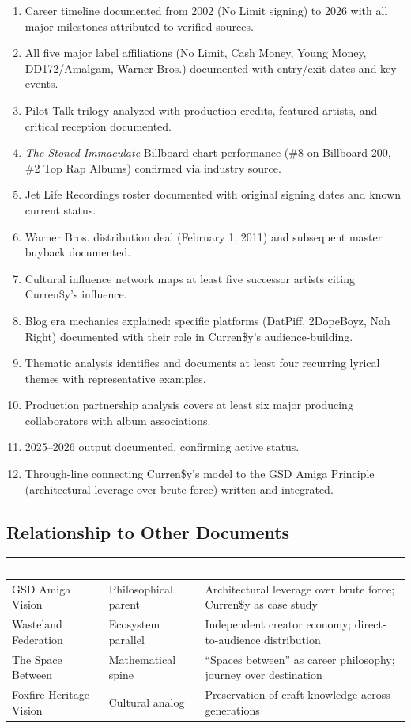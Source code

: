 \documentclass[11pt,letterpaper]{article}
\newcommand{\tableheader}[1]{\textbf{\sffamily\textcolor{white}{#1}}}
\begin{document}
\begin{enumerate}
  \item Career timeline documented from 2002 (No Limit signing) to 2026 with all major milestones attributed to verified sources.
  \item All five major label affiliations (No Limit, Cash Money, Young Money, DD172/Amalgam, Warner Bros.) documented with entry/exit dates and key events.
  \item Pilot Talk trilogy analyzed with production credits, featured artists, and critical reception documented.
  \item \textit{The Stoned Immaculate} Billboard chart performance (\#8 on Billboard 200, \#2 Top Rap Albums) confirmed via industry source.
  \item Jet Life Recordings roster documented with original signing dates and known current status.
  \item Warner Bros. distribution deal (February 1, 2011) and subsequent master buyback documented.
  \item Cultural influence network maps at least five successor artists citing Curren\$y's influence.
  \item Blog era mechanics explained: specific platforms (DatPiff, 2DopeBoyz, Nah Right) documented with their role in Curren\$y's audience-building.
  \item Thematic analysis identifies and documents at least four recurring lyrical themes with representative examples.
  \item Production partnership analysis covers at least six major producing collaborators with album associations.
  \item 2025–2026 output documented, confirming active status.
  \item Through-line connecting Curren\$y's model to the GSD Amiga Principle (architectural leverage over brute force) written and integrated.
\end{enumerate}

\subsection{Relationship to Other Documents}

\begin{center}
\begin{tabularx}{\textwidth}{L{4cm}L{4cm}X}
\toprule
{}
\tableheader{Document} & \tableheader{Relationship} & \tableheader{Connection Point} \\
\midrule
GSD Amiga Vision & Philosophical parent & Architectural leverage over brute force; Curren\$y as case study \\
Wasteland Federation & Ecosystem parallel & Independent creator economy; direct-to-audience distribution \\
The Space Between & Mathematical spine & ``Spaces between'' as career philosophy; journey over destination \\
Foxfire Heritage Vision & Cultural analog & Preservation of craft knowledge across generations \\
\bottomrule
\end{tabularx}
\end{center}
\end{document}
